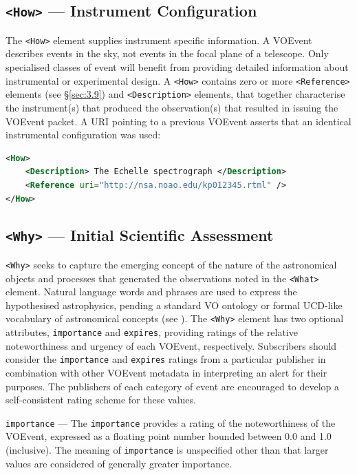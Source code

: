 \documentclass[11pt,a4paper]{ivoa}
\begin{document}
\subsection{{\tt <How>} --- Instrument Configuration}
\label{sec:3.5}
The {\tt <How>} element supplies instrument specific information. A VOEvent describes events in the sky, not events in the focal plane of a telescope. Only specialised classes of event will benefit from providing detailed information about instrumental or experimental design. A {\tt <How>} contains zero or more {\tt <Reference>} elements (see \S\ref{sec:3.9}) and {\tt <Description>} elements, that together characterise the instrument(s) that produced the observation(s) that resulted in issuing the VOEvent packet. A URI pointing to a previous VOEvent asserts that an identical instrumental configuration was used: 
\begin{lstlisting}[language=XML]
<How>
    <Description> The Echelle spectrograph </Description>
    <Reference uri="http://nsa.noao.edu/kp012345.rtml" />
</How> 
\end{lstlisting}

\subsection{{\tt <Why>} --- Initial Scientific Assessment}
\label{sec:3.6}
{\tt <Why>} seeks to capture the emerging concept of the nature of the astronomical objects and processes that generated the observations noted in the {\tt <What>} element. Natural language words and phrases are used to express the hypothesised astrophysics, pending a standard VO ontology or formal UCD-like vocabulary of astronomical concepts (see \citep{2018ivoa.spec.0527M}).
The {\tt <Why>} element has two optional attributes, {\tt importance} and {\tt expires}, providing ratings of the relative noteworthiness and urgency of each VOEvent, respectively. Subscribers should consider the {\tt importance} and {\tt expires} ratings from a particular publisher in combination with other VOEvent metadata in interpreting an alert for their purposes. The publishers of each category of event are encouraged to develop a self-consistent rating scheme for these values. 

 {\tt importance}\label{sec:3.6.1} ---
The {\tt importance} provides a rating of the noteworthiness of the VOEvent, expressed as a floating point number bounded between 0.0 and 1.0 (inclusive). The meaning of {\tt importance} is unspecified other than that larger values are considered of generally greater importance. 
\end{document}
